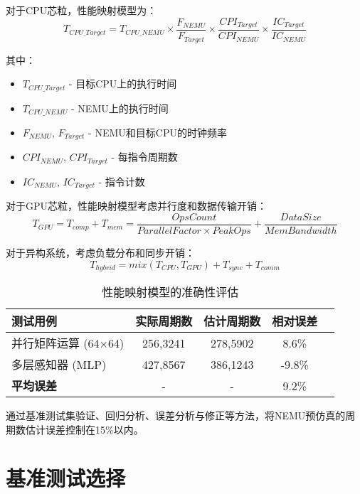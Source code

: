 \documentclass[bachelor]{thesis-uestc}
\begin{document}
对于CPU芯粒，性能映射模型为：
\begin{equation}
T_{CPU\_Target} = T_{CPU\_NEMU} \times \frac{F_{NEMU}}{F_{Target}} \times \frac{CPI_{Target}}{CPI_{NEMU}} \times \frac{IC_{Target}}{IC_{NEMU}}
\end{equation}

其中：
\begin{itemize}
    \item $T_{CPU\_Target}$ - 目标CPU上的执行时间
    \item $T_{CPU\_NEMU}$ - NEMU上的执行时间
    \item $F_{NEMU}$, $F_{Target}$ - NEMU和目标CPU的时钟频率
    \item $CPI_{NEMU}$, $CPI_{Target}$ - 每指令周期数
    \item $IC_{NEMU}$, $IC_{Target}$ - 指令计数
\end{itemize}

对于GPU芯粒，性能映射模型考虑并行度和数据传输开销：
\begin{equation}
T_{GPU} = T_{comp} + T_{mem} = \frac{OpsCount}{ParallelFactor \times PeakOps} + \frac{DataSize}{MemBandwidth}
\end{equation}

对于异构系统，考虑负载分布和同步开销：
\begin{equation}
T_{hybrid} = mix(T_{CPU}, T_{GPU}) + T_{sync} + T_{comm}
\end{equation}

\begin{table}[htbp]
\caption{性能映射模型的准确性评估}
\centering
\begin{tabular}{|l|c|c|c|c|}
\hline
\textbf{测试用例} & \textbf{实际周期数} & \textbf{估计周期数} & \textbf{相对误差}   \\
\hline
并行矩阵运算 (64×64) & 256,3241 & 278,5902 & 8.6\%  \\
\hline
多层感知器 (MLP) & 427,8567 & 386,1243 & -9.8\%  \\
\hline
\textbf{平均误差} & - & - & 9.2\%  \\
\hline
\end{tabular}
\label{tab:performance_mapping}
\end{table}

通过基准测试集验证、回归分析、误差分析与修正等方法，将NEMU预仿真的周期数估计误差控制在15\%以内。

\section{基准测试选择}
\end{document}
